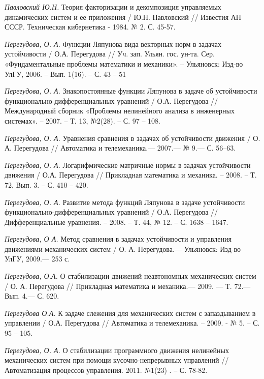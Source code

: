 \begin{thebibliography}{10}
	{\it Павловский Ю.Н.} Теория факторизации и декомпозиция управляемых динамических систем и ее приложения / Ю.Н. Павловский // Известия АН СССР. Техническая кибернетика - 1984. № 2. С. 45-57.
	
	{\it Перегудова, О. А.} Функции Ляпунова вида векторных норм в задачах устойчивости / О.А. Перегудова // Уч. зап. Ульян. гос. ун-та. Сер. 	«Фундаментальные проблемы математики и механики». – Ульяновск: Изд-во УлГУ, 2006. – Вып. 1(16). – С. 43 – 51
	
	{\it Перегудова, О. А.} Знакопостоянные функции Ляпунова в задаче об устойчивости функционально-дифференциальных уравнений / О.А. Перегудова // 	Международный сборник «Проблемы нелинейного анализа в инженерных системах». – 2007. – Т. 13, №2(28). – С. 97 – 108.

	{\it Перегудова, О. А.} Уравнения сравнения в задачах об устойчивости движения / О. А. Перегудова // Автоматика и телемеханика.—  2007.— № 9.— 		С. 56–63.
	
	{\it Перегудова, О. А.} Логарифмические матричные нормы в задачах устойчивости движения / О.А. Перегудова // Прикладная математика и механика. – 	2008. – Т. 72, Вып. 3. – С. 410 – 420.
	
	{\it Перегудова, О. А.} Развитие метода функций Ляпунова в задаче устойчивости функционально-дифференциальных уравнений / О.А. Перегудова // 		Дифференциальные уравнения. – 2008. – Т. 44, № 12. – С. 1638 – 1647.

	{\it Перегудова, О А.} Метод сравнения в задачах устойчивости и управления движениями
	механических систем / О. А. Перегудова.— Ульяновск: Изд-во УлГУ, 2009.— 253 с.

	{\it Перегудова, О.А.} О стабилизации движений неавтономных механических систем / О. А. Перегудова // Прикладная математика и механика.—  2009.	— Т. 72.— Вып. 4.— С. 620.
	
	{\it Перегудова О.А.} К задаче слежения для механических систем с запаздыванием в управлении / О.А. Перегудова // Автоматика и телемеханика. –  	2009. - № 5. – С. 95 – 105.
	
	{\it Перегудова, О. А.} О стабилизации программного движения нелинейных механических систем при помощи кусочно-непрерывных управлений // 		Автоматизация процессов управления. 2011. №1(23) . – С. 78-82.
	

\end{thebibliography}
